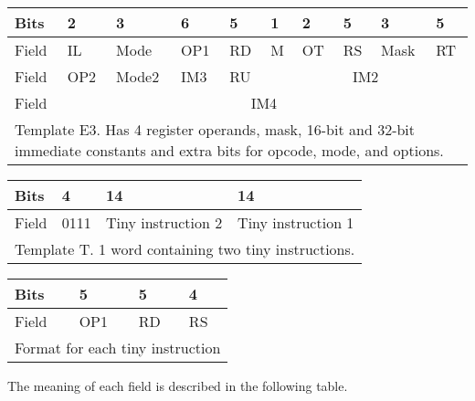 \documentclass[forwardcom.tex]{subfiles}
\begin{document}
\begin{longtable}[l]{|p{8mm}|p{8mm}|p{8mm}|p{8mm}|p{8mm}|p{8mm}|p{8mm}|p{8mm}|p{8mm}|p{8mm}|}
\endfirsthead
\label{table:templateE3}
\endhead
\hline
 Bits & 2 & 3 & 6 & 5 & 1 & 2 & 5 & 3 & 5 \\
\hline
Field & IL & Mode & OP1 & RD & M & OT & RS & Mask & RT \\
\hline
Field & OP2 & \small Mode2 & IM3 & RU & \multicolumn{5}{|c|}{ IM2 } \\
\hline
Field & \multicolumn{9}{|c|}{ IM4 } \\   
\hline
\multicolumn{10}{|p{118mm}|}{
Template E3. Has 4 register operands, mask, 16-bit and 32-bit immediate constants and extra bits for opcode, mode, and options.} \\
\hline
\end{longtable}


\begin{longtable}[l]{|p{8mm}|p{8mm}|p{40mm}|p{40mm}|}
\endfirsthead
\label{table:templateT}
\endhead
\hline
 Bits & 4 & \hspace{16mm} 14 & \hspace{16mm} 14 \\
\hline
Field & 0111 & \hspace{5mm} Tiny instruction 2 & \hspace{5mm} Tiny instruction 1 \\
\hline
\multicolumn{4}{|p{118mm}|}{
Template T. 1 word containing two tiny instructions.} \\
\hline
\end{longtable}

\begin{longtable}[l]{|p{10mm}|p{15mm}|p{15mm}|p{15mm}|}
\endfirsthead
\label{table:tinyFormat}
\endhead
\hline
Bits & 5 & 5 & 4 \\
\hline
Field & OP1 & RD & RS \\
\hline
\multicolumn{4}{|l|}{
Format for each tiny instruction } \\
\hline
\end{longtable}
\vspace{2mm}


The meaning of each field is described in the following table.
\end{document}
